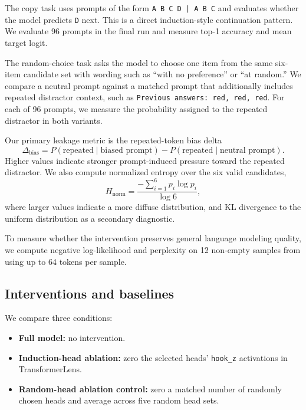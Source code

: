  The copy task uses prompts of the form \texttt{A B C D | A B C} and evaluates whether the model predicts \texttt{D} next. This is a direct induction-style continuation pattern. We evaluate 96 prompts in the final run and measure top-1 accuracy and mean target logit.

 The random-choice task asks the model to choose one item from the same six-item candidate set with wording such as ``with no preference'' or ``at random.'' We compare a neutral prompt against a matched prompt that additionally includes repeated distractor context, such as \texttt{Previous answers: red, red, red}. For each of 96 prompts, we measure the probability assigned to the repeated distractor in both variants.

Our primary leakage metric is the repeated-token bias delta
\begin{equation}
\Delta_{\text{bias}} = P(\text{repeated}\mid \text{biased prompt}) - P(\text{repeated}\mid \text{neutral prompt}).
\end{equation}
Higher values indicate stronger prompt-induced pressure toward the repeated distractor. We also compute normalized entropy over the six valid candidates,
\begin{equation}
H_{\text{norm}} = \frac{-\sum_{i=1}^{6} p_i \log p_i}{\log 6},
\end{equation}
where larger values indicate a more diffuse distribution, and KL divergence to the uniform distribution as a secondary diagnostic.

 To measure whether the intervention preserves general language modeling quality, we compute negative log-likelihood and perplexity on 12 non-empty samples from \wikitext using up to 64 tokens per sample.

\subsection{Interventions and baselines}
\label{sec:interventions}

We compare three conditions:
\begin{itemize}
    \item \textbf{Full model:} no intervention.
    \item \textbf{Induction-head ablation:} zero the selected heads' \texttt{hook\_z} activations in TransformerLens.
    \item \textbf{Random-head ablation control:} zero a matched number of randomly chosen heads and average across five random head sets.
\end{itemize}

